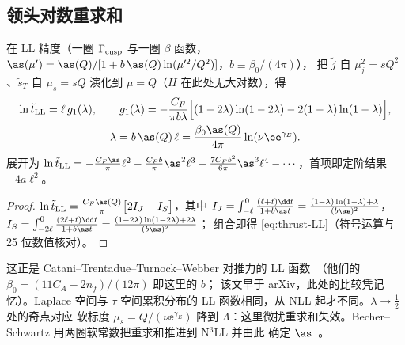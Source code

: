 \subsection{领头对数重求和}

\begin{proposition}[LL 指数]\tagR\label{prop:thrust-LL}
在 LL 精度（一圈 $\Gamma_{\rm cusp}$ 与一圈 $\beta$ 函数，$\as(\mu')=\as(Q)/[1+b\,\as(Q)\ln(\mu'^2/Q^2)]$，$b\equiv\beta_0/(4\pi)$），
把 $\tilde j$ 自 $\mu_j^2=sQ^2$、$\tilde s_T$ 自 $\mu_s=sQ$ 演化到 $\mu=Q$（$H$ 在此处无大对数），得
\begin{equation}\label{eq:thrust-LL}
\begin{gathered}
\ln\tilde t_{\rm LL}=\ell\,g_1(\lambda),\qquad
g_1(\lambda)=-\frac{C_F}{\pi b\lambda}\Big[(1-2\lambda)\ln(1-2\lambda)-2(1-\lambda)\ln(1-\lambda)\Big],\\
\lambda=b\,\as(Q)\,\ell=\frac{\beta_0\as(Q)}{4\pi}\ln(\nu\ee^{\gamma_E}).
\end{gathered}
\end{equation}
展开为 $\ln\tilde t_{\rm LL}=-\frac{C_F\as}{\pi}\ell^2-\frac{C_Fb}{\pi}\as^2\ell^3-\frac{7C_Fb^2}{6\pi}\as^3\ell^4-\cdots$，首项即定阶结果 $-4a\ell^2$。
\end{proposition}

\begin{proof}
$\ln\tilde t_{\rm LL}=\frac{C_F\as(Q)}{\pi}\big[2I_J-I_S\big]$，其中
$I_J=\int_{-\ell}^0\frac{(\ell+t)\dd t}{1+b\as t}=\frac{(1-\lambda)\ln(1-\lambda)+\lambda}{(b\as)^2}$，
$I_S=\int_{-2\ell}^0\frac{(2\ell+t)\dd t}{1+b\as t}=\frac{(1-2\lambda)\ln(1-2\lambda)+2\lambda}{(b\as)^2}$；
组合即得 \cref{eq:thrust-LL}（符号运算与 25 位数值核对）。
\end{proof}

这正是 Catani--Trentadue--Turnock--Webber 对推力的 LL 函数~\cite{CataniEtAl1993}（他们的 $\beta_0=(11C_A-2n_f)/(12\pi)$ 即这里的 $b$；
该文早于 arXiv，此处的比较凭记忆）。Laplace 空间与 $\tau$ 空间累积分布的 LL 函数相同，从 NLL 起才不同。$\lambda\to\frac12$ 处的奇点对应
软标度 $\mu_s=Q/(\nu\ee^{\gamma_E})$ 降到 $\Lambda$：这里微扰重求和失效。Becher--Schwartz 用两圈软常数把重求和推进到 N$^3$LL 并由此
确定 $\as$~\cite{BecherSchwartz2008}。

